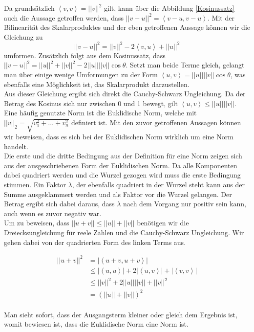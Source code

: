Da grundsätzlich $\left\langle v,v\right\rangle  = ||v||^2$ gilt, kann über die Abbildung \ref{Kosinussatz} auch die Aussage getroffen werden, dass $||v-u||^2 = \left\langle v-u,v-u\right\rangle $. Mit der Bilinearität des Skalarproduktes und der eben getroffenen Aussage können wir die Gleichung zu 
\begin{equation*}
||v-u||^2 = ||v||^2 - 2\left\langle v,u\right\rangle  + ||u||^2 
\end{equation*}
umformen.
Zusätzlich folgt aus dem Kosinussatz, dass $||v-u||^2 = ||u||^2 + ||v||^2 - 2 ||u|| ||v|| \cos\theta$. Setzt man beide Terme gleich, gelangt man über einige wenige Umformungen zu der Form $\left\langle u,v\right\rangle  = ||u|| ||v|| \cos\theta$, was ebenfalls eine Möglichkeit ist, das Skalarprodukt darzustellen.\\
Aus dieser Gleichung ergibt sich direkt die Cauchy-Schwarz Ungleichung. Da der Betrag des Kosinus sich nur zwischen 0 und 1 bewegt, gilt $\left\langle u,v\right\rangle  \leq ||u|| ||v||$.\\
Eine häufig genutzte Norm ist die Euklidische Norm, welche mit $||v||_2 = \sqrt{v_1^2 + \dots + v_n^2}$ definiert ist. Mit den zuvor getroffenen Aussagen können wir beweisen, dass es sich bei der Euklidischen Norm wirklich um eine Norm handelt.\\
Die erste und die dritte Bedingung aus der Definition für eine Norm zeigen sich aus der ausgeschriebenen Form der Euklidischen Norm. Da alle Komponenten dabei quadriert werden und die Wurzel gezogen wird muss die erste Bedingung stimmen. Ein Faktor $\lambda$, der ebenfalls quadriert in der Wurzel steht kann aus der Summe ausgeklammert werden und als Faktor vor die Wurzel gelangen. Der Betrag ergibt sich dabei daraus, dass $\lambda$ nach dem Vorgang nur positiv sein kann, auch wenn es zuvor negativ war.\\
Um zu beweisen, dass $||u+v|| \leq ||u|| + ||v||$ benötigen wir die Dreiecksungleichung für reele Zahlen und die Cauchy-Schwarz Ungleichung. Wir gehen dabei von der quadrierten Form des linken Terms aus.

\begin{align*}
||u+v||^2 &= |\left\langle u+v,u+v\right\rangle|\\
&\leq |\left\langle u,u\right\rangle| + 2|\left\langle u,v\right\rangle| + |\left\langle v,v\right\rangle|\\
&\leq ||v||^2 + 2||u|| ||v|| + ||v||^2\\
&= (||u|| + ||v||)^2\\
\end{align*}

Man sieht sofort, dass der Ausgangsterm kleiner oder gleich dem Ergebnis ist, womit bewiesen ist, dass die Euklidische Norm eine Norm ist.

%